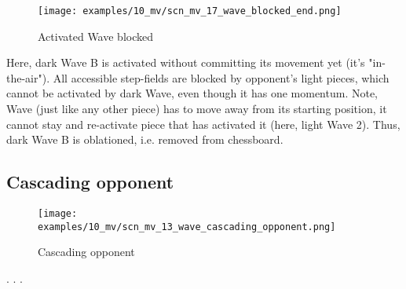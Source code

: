 \vspace*{-2.1\baselineskip}
\noindent
\begin{figure}[h]
\texttt{[image: examples/10\_mv/scn\_mv\_17\_wave\_blocked\_end.png]}
\caption{Activated Wave blocked}
\label{fig:scn_mv_17_wave_blocked_end}
\end{figure}

Here, dark Wave B is activated without committing its movement yet (it's "in-the-air").
All accessible step-fields are blocked by opponent's light pieces, which cannot be
activated by dark Wave, even though it has one momentum.
Note, Wave (just like any other piece) has to move away from its starting position,
it cannot stay and re-activate piece that has activated it (here, light Wave 2).
Thus, dark Wave B is oblationed, i.e. removed from chessboard.

\clearpage %

\subsection*{Cascading opponent}

\vspace*{-1.4\baselineskip}
\noindent
\begin{figure}[h]
\texttt{[image: examples/10\_mv/scn\_mv\_13\_wave\_cascading\_opponent.png]}
\caption{Cascading opponent}
\label{fig:scn_mv_13_wave_cascading_opponent}
\end{figure}

. . .





